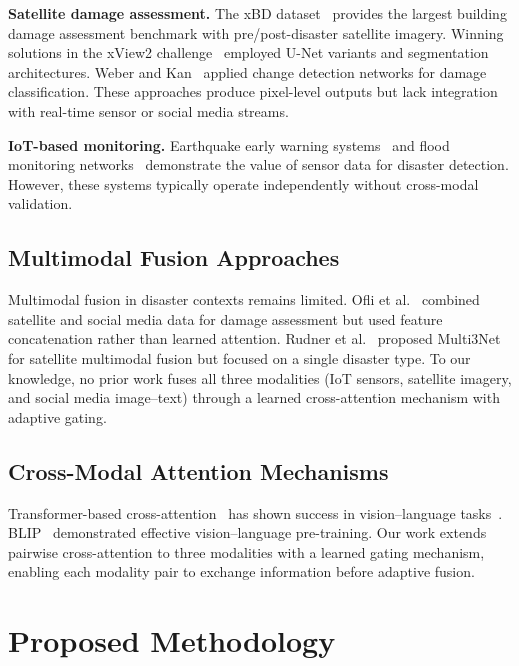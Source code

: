 \documentclass[journal]{IEEEtran}
\begin{document}
\textbf{Satellite damage assessment.} The xBD dataset~\cite{gupta2019xbd} provides the largest building damage assessment benchmark with pre/post-disaster satellite imagery. Winning solutions in the xView2 challenge~\cite{xview2} employed U-Net variants and segmentation architectures. Weber and Kan~\cite{weber2020building} applied change detection networks for damage classification. These approaches produce pixel-level outputs but lack integration with real-time sensor or social media streams.

\textbf{IoT-based monitoring.} Earthquake early warning systems~\cite{allen2009real} and flood monitoring networks~\cite{basha2008model} demonstrate the value of sensor data for disaster detection. However, these systems typically operate independently without cross-modal validation.

\subsection{Multimodal Fusion Approaches}

Multimodal fusion in disaster contexts remains limited. Ofli et al.~\cite{ofli2020analysis} combined satellite and social media data for damage assessment but used feature concatenation rather than learned attention. Rudner et al.~\cite{rudner2019multi3net} proposed Multi3Net for satellite multimodal fusion but focused on a single disaster type. To our knowledge, no prior work fuses all three modalities (IoT sensors, satellite imagery, and social media image--text) through a learned cross-attention mechanism with adaptive gating.

\subsection{Cross-Modal Attention Mechanisms}

Transformer-based cross-attention~\cite{vaswani2017attention} has shown success in vision--language tasks~\cite{lu2019vilbert,tan2019lxmert}. BLIP~\cite{li2022blip} demonstrated effective vision--language pre-training. Our work extends pairwise cross-attention to three modalities with a learned gating mechanism, enabling each modality pair to exchange information before adaptive fusion.

\section{Proposed Methodology}
\end{document}
